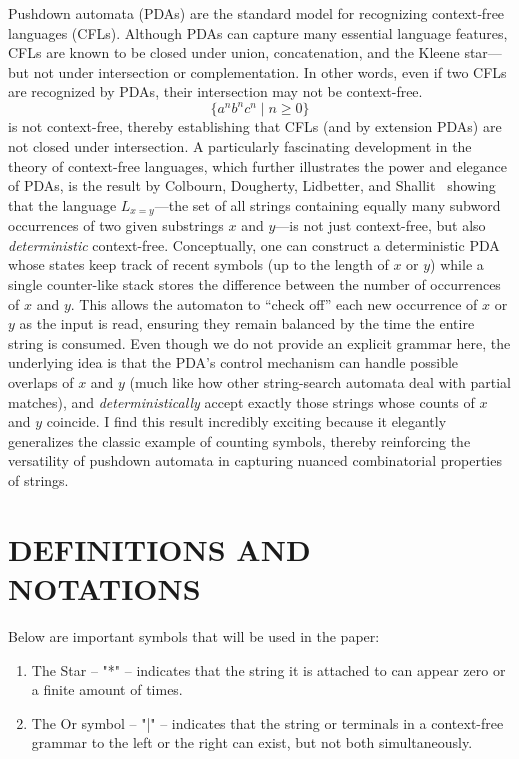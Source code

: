 \documentclass[sigconf,anonymous,review]{acmart}
\begin{document}
Pushdown automata (PDAs) are the standard model for recognizing context‐free languages (CFLs). Although PDAs can capture many essential language features, CFLs are known to be closed under union, concatenation, and the Kleene star—but not under intersection or complementation. In other words, even if two CFLs are recognized by PDAs, their intersection may not be context-free. 
\[
\{ a^n b^n c^n \mid n \ge 0 \}
\]
is not context-free, thereby establishing that CFLs (and by extension PDAs) are not closed under intersection.
A particularly fascinating development in the theory of context-free languages, which further
illustrates the power and elegance of PDAs, is the result by Colbourn, Dougherty, Lidbetter,
and Shallit~\cite{colbourn_counting_2018} showing that the language \(L_{x=y}\)---the set
of all strings containing equally many subword occurrences of two given substrings \(x\) and
\(y\)---is not just context-free, but also \emph{deterministic} context-free. Conceptually,
one can construct a deterministic PDA whose states keep track of recent symbols (up to the
length of \(x\) or \(y\)) while a single counter-like stack stores the difference between the
number of occurrences of \(x\) and \(y\). This allows the automaton to ``check off'' each new
occurrence of \(x\) or \(y\) as the input is read, ensuring they remain balanced by the time
the entire string is consumed. Even though we do not provide an explicit grammar here, the
underlying idea is that the PDA's control mechanism can handle possible overlaps of \(x\)
and \(y\) (much like how other string-search automata deal with partial matches), and
\emph{deterministically} accept exactly those strings whose counts of \(x\) and \(y\) coincide.
I find this result incredibly exciting because it elegantly generalizes the classic example of
counting symbols, thereby reinforcing the versatility of pushdown automata in capturing
nuanced combinatorial properties of strings.

\section{DEFINITIONS AND NOTATIONS}
Below are important symbols that will be used in the paper: 
\begin{enumerate}{}
    \item The Star – "*" – indicates that the string it is attached to can appear zero or a finite amount of times.
    \item The Or symbol – "|" – indicates that the string or terminals in a context-free grammar to the left or the right can exist, but not both simultaneously.
\end{enumerate}
\end{document}
